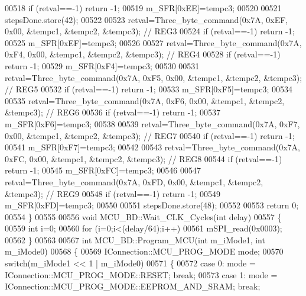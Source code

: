 \begin{DoxyCode}
{{00518     \textcolor{keywordflow}{if} (retval==-1) \textcolor{keywordflow}{return} -1;
00519     m\_SFR[0xEE]=tempc3;
00520 
00521     stepsDone.store(42);
00522 
00523     retval=Three\_byte\_command(0x7A, 0xEF, 0x00, &tempc1, &tempc2, &tempc3); \textcolor{comment}{// REG3}
00524     \textcolor{keywordflow}{if} (retval==-1) \textcolor{keywordflow}{return} -1;
00525     m\_SFR[0xEF]=tempc3;
00526 
00527     retval=Three\_byte\_command(0x7A, 0xF4, 0x00, &tempc1, &tempc2, &tempc3); \textcolor{comment}{// REG4}
00528     \textcolor{keywordflow}{if} (retval==-1) \textcolor{keywordflow}{return} -1;
00529     m\_SFR[0xF4]=tempc3;
00530 
00531     retval=Three\_byte\_command(0x7A, 0xF5, 0x00, &tempc1, &tempc2, &tempc3); \textcolor{comment}{// REG5}
00532     \textcolor{keywordflow}{if} (retval==-1) \textcolor{keywordflow}{return} -1;
00533     m\_SFR[0xF5]=tempc3;
00534 
00535     retval=Three\_byte\_command(0x7A, 0xF6, 0x00, &tempc1, &tempc2, &tempc3); \textcolor{comment}{// REG6}
00536     \textcolor{keywordflow}{if} (retval==-1) \textcolor{keywordflow}{return} -1;
00537     m\_SFR[0xF6]=tempc3;
00538 
00539     retval=Three\_byte\_command(0x7A, 0xF7, 0x00, &tempc1, &tempc2, &tempc3); \textcolor{comment}{// REG7}
00540     \textcolor{keywordflow}{if} (retval==-1) \textcolor{keywordflow}{return} -1;
00541     m\_SFR[0xF7]=tempc3;
00542 
00543     retval=Three\_byte\_command(0x7A, 0xFC, 0x00, &tempc1, &tempc2, &tempc3); \textcolor{comment}{// REG8}
00544     \textcolor{keywordflow}{if} (retval==-1) \textcolor{keywordflow}{return} -1;
00545     m\_SFR[0xFC]=tempc3;
00546 
00547     retval=Three\_byte\_command(0x7A, 0xFD, 0x00, &tempc1, &tempc2, &tempc3); \textcolor{comment}{// REG9}
00548     \textcolor{keywordflow}{if} (retval==-1) \textcolor{keywordflow}{return} -1;
00549     m\_SFR[0xFD]=tempc3;
00550 
00551     stepsDone.store(48);
00552 
00553     \textcolor{keywordflow}{return} 0;
00554 \}
00555 
00556 \textcolor{keywordtype}{void} MCU\_BD::Wait\_CLK\_Cycles(\textcolor{keywordtype}{int} delay)
00557 \{
00559     \textcolor{keywordtype}{int} i=0;
00560     \textcolor{keywordflow}{for} (i=0;i<(delay/64);i++)
00561            mSPI\_read(0x0003);
00562 \}
00563 
00567 \textcolor{keywordtype}{int} MCU\_BD::Program\_MCU(\textcolor{keywordtype}{int} m\_iMode1, \textcolor{keywordtype}{int} m\_iMode0)
00568 \{
00569     IConnection::MCU_PROG_MODE mode;
00570     \textcolor{keywordflow}{switch}(m\_iMode1 << 1 | m\_iMode0)
00571     \{
00572     \textcolor{keywordflow}{case} 0: mode = IConnection::MCU\_PROG\_MODE::RESET; \textcolor{keywordflow}{break};
00573     \textcolor{keywordflow}{case} 1: mode = IConnection::MCU\_PROG\_MODE::EEPROM\_AND\_SRAM; \textcolor{keywordflow}{break};
}}
\end{DoxyCode}
